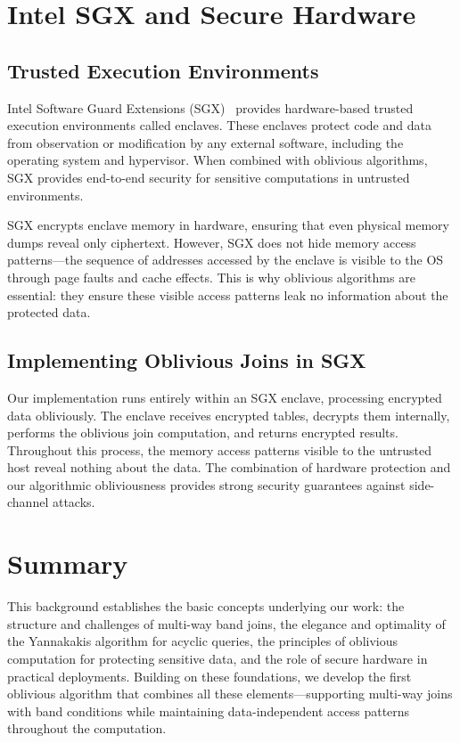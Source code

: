 \section{Intel SGX and Secure Hardware}

\subsection{Trusted Execution Environments}

Intel Software Guard Extensions (SGX)~\cite{sgx2016} provides hardware-based trusted execution environments called enclaves. These enclaves protect code and data from observation or modification by any external software, including the operating system and hypervisor. When combined with oblivious algorithms, SGX provides end-to-end security for sensitive computations in untrusted environments.

SGX encrypts enclave memory in hardware, ensuring that even physical memory dumps reveal only ciphertext. However, SGX does not hide memory access patterns---the sequence of addresses accessed by the enclave is visible to the OS through page faults and cache effects. This is why oblivious algorithms are essential: they ensure these visible access patterns leak no information about the protected data.

\subsection{Implementing Oblivious Joins in SGX}

Our implementation runs entirely within an SGX enclave, processing encrypted data obliviously. The enclave receives encrypted tables, decrypts them internally, performs the oblivious join computation, and returns encrypted results. Throughout this process, the memory access patterns visible to the untrusted host reveal nothing about the data. The combination of hardware protection and our algorithmic obliviousness provides strong security guarantees against side-channel attacks.

\section{Summary}

This background establishes the basic concepts underlying our work: the structure and challenges of multi-way band joins, the elegance and optimality of the Yannakakis algorithm for acyclic queries, the principles of oblivious computation for protecting sensitive data, and the role of secure hardware in practical deployments. Building on these foundations, we develop the first oblivious algorithm that combines all these elements---supporting multi-way joins with band conditions while maintaining data-independent access patterns throughout the computation.